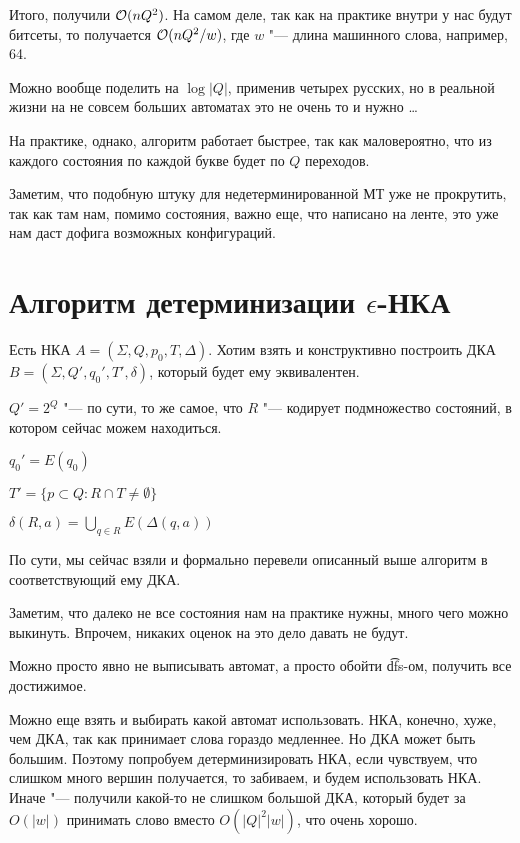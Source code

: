 Итого, получили $\mathcal{O}(nQ^2)$. На самом деле, так как на практике внутри у нас будут битсеты, то получается $\mathcal{O}(nQ^2/w)$, где $w$ "--- длина машинного слова, например, 64.

Можно вообще поделить на $\log |Q|$, применив четырех русских, но в реальной жизни на не совсем больших автоматах это не очень то и нужно \dots

\begin{Rem}
На практике, однако, алгоритм работает быстрее, так как маловероятно, что из каждого состояния по каждой букве будет по $Q$ переходов.
\end{Rem}

\begin{Rem}
Заметим, что подобную штуку для недетерминированной МТ уже не прокрутить, так как там нам, помимо состояния, важно еще, что написано на ленте, это уже нам даст дофига возможных конфигураций.
\end{Rem}


\section{Алгоритм детерминизации \texorpdfstring{$\epsilon$}{epsilon}-НКА}
Есть НКА $A = (\Sigma, Q, p_0, T, \Delta)$. 
Хотим взять и конструктивно построить ДКА $B = (\Sigma, Q', q_0', T', \delta)$, который будет ему эквивалентен.

$Q' = 2^Q$ "--- по сути, то же самое, что $R$ "--- кодирует подмножество состояний, в котором сейчас можем находиться.

$q_0' = E(q_0)$

$T' = \{p \subset Q: R\cap T \neq \emptyset\}$

$\delta(R, a) = \bigcup\limits_{q \in R} E(\Delta(q, a))$

По сути, мы сейчас взяли и формально перевели описанный выше алгоритм в соответствующий ему ДКА.

\begin{Rem}
Заметим, что далеко не все состояния нам на практике нужны, много чего можно выкинуть. Впрочем, никаких оценок на это дело давать не будут.

Можно просто явно не выписывать автомат, а просто обойти \t{dfs}-ом, получить все достижимое.

Можно еще взять и выбирать какой автомат использовать. 
НКА, конечно, хуже, чем ДКА, так как принимает слова гораздо медленнее. Но ДКА может быть большим. 
Поэтому попробуем детерминизировать НКА, если чувствуем, что слишком много вершин получается, то забиваем, и будем использовать НКА. 
Иначе "--- получили какой-то не слишком большой ДКА, который будет за $O(|w|)$ принимать слово вместо $O(|Q|^2|w|)$, что очень хорошо.
\end{Rem}


